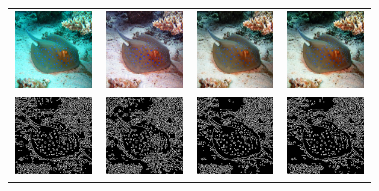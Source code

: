 \documentclass[letterpaper, 10pt, conference]{ieeeconf}
\begin{document}
\begin{figure}
\begin{tabular}{p{1.7cm} p{1.7cm} p{1.7cm} p{1.7cm}}
   \includegraphics[width=0.8in]{3_original} &
   \includegraphics[width=0.8in]{3_cimg} &
   \includegraphics[width=0.8in]{3_u0img} &
   \includegraphics[width=0.8in]{3_u1img} \\ [-1ex]
   \includegraphics[width=0.8in]{3_oedges} &
   \includegraphics[width=0.8in]{3_cedges} &
   \includegraphics[width=0.8in]{3_u0edges} &
   \includegraphics[width=0.8in]{3_u1edges} \\
   

\end{tabular}
\end{figure}
\end{document}
